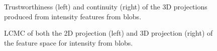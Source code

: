 \begin{figure}[H]
	\centering
	\caption{Trustworthiness (left) and continuity (right) of the 3D projections produced from intensity features from blobs.}\label{fig:TC_3d_intensity}
\end{figure}

\begin{figure}[H]
	\centering
	\caption{LCMC of both the 2D projection (left) and 3D projection (right) of the feature space for intensity from blobs.}\label{fig:LCMC_intensity}
\end{figure}
\clearpage

